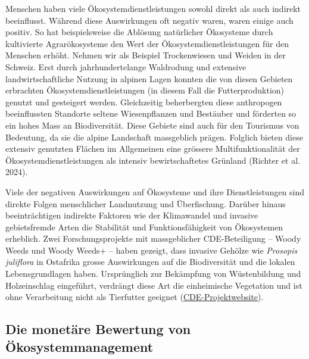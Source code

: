 \documentclass[
  nswissgerman,
  a4paper,
  DIV=11,
  numbers=noendperiod,
  oneside,
  openany]{scrreprt}
\begin{document}
Menschen haben viele Ökosystemdienstleistungen sowohl direkt als auch
indirekt beeinflusst. Während diese Auswirkungen oft negativ waren,
waren einige auch positiv. So hat beispielsweise die Ablösung
natürlicher Ökosysteme durch kultivierte Agrarökosysteme den Wert der
Ökosystemdienstleistungen für den Menschen erhöht. Nehmen wir als
Beispiel Trockenwiesen und Weiden in der Schweiz. Erst durch
jahrhundertelange Waldrodung und extensive landwirtschaftliche Nutzung
in alpinen Lagen konnten die von diesen Gebieten erbrachten
Ökosystemdienstleistungen (in diesem Fall die Futterproduktion) genutzt
und gesteigert werden. Gleichzeitig beherbergten diese anthropogen
beeinflussten Standorte seltene Wiesenpflanzen und Bestäuber und
förderten so ein hohes Mass an Biodiversität. Diese Gebiete sind auch
für den Tourismus von Bedeutung, da sie die alpine Landschaft
massgeblich prägen. Folglich bieten diese extensiv genutzten Flächen im
Allgemeinen eine grössere Multifunktionalität der
Ökosystemdienstleistungen als intensiv bewirtschaftetes Grünland
(Richter et al. 2024).

Viele der negativen Auswirkungen auf Ökosysteme und ihre
Dienstleistungen sind direkte Folgen menschlicher Landnutzung und
Überfischung. Darüber hinaus beeinträchtigen indirekte Faktoren wie der
Klimawandel und invasive gebietsfremde Arten die Stabilität und
Funktionsfähigkeit von Ökosystemen erheblich. Zwei Forschungsprojekte
mit massgeblicher CDE-Beteiligung -- Woody Weeds und Woody Weeds+ --
haben gezeigt, dass invasive Gehölze wie \emph{Prosopis juliflora} in
Ostafrika grosse Auswirkungen auf die Biodiversität und die lokalen
Lebensgrundlagen haben. Ursprünglich zur Bekämpfung von Wüstenbildung
und Holzeinschlag eingeführt, verdrängt diese Art die einheimische
Vegetation und ist ohne Verarbeitung nicht als Tierfutter geeignet
(\href{https://www.cde.unibe.ch/research/projects/woody_invasive_alien_species_in_eastern_africa/index_eng.html}{CDE-Projektwebsite}).

\subsection{Die monetäre Bewertung von
Ökosystemmanagement}\label{die-monetuxe4re-bewertung-von-uxf6kosystemmanagement}
\end{document}
